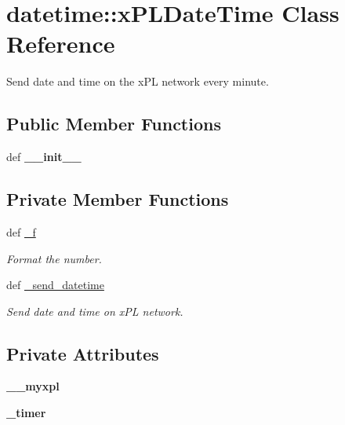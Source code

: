 \hypertarget{classdatetime_1_1xPLDateTime}{
\section{datetime::xPLDateTime Class Reference}
\label{classdatetime_1_1xPLDateTime}
}
Send date and time on the xPL network every minute.  


\subsection*{Public Member Functions}
\begin{CompactItemize}
\item 
\hypertarget{classdatetime_1_1xPLDateTime_b39a3cb860ddd3595e348bc7f910f1e4}{
def \textbf{\_\-\_\-init\_\-\_\-}}
\label{classdatetime_1_1xPLDateTime_b39a3cb860ddd3595e348bc7f910f1e4}

\end{CompactItemize}
\subsection*{Private Member Functions}
\begin{CompactItemize}
\item 
\hypertarget{classdatetime_1_1xPLDateTime_56f581af02f2f66b6b8d21fe910b9b5d}{
def \hyperlink{classdatetime_1_1xPLDateTime_56f581af02f2f66b6b8d21fe910b9b5d}{\_\-f}}
\label{classdatetime_1_1xPLDateTime_56f581af02f2f66b6b8d21fe910b9b5d}

\begin{CompactList}\small\item\em Format the number. \item\end{CompactList}\item 
\hypertarget{classdatetime_1_1xPLDateTime_8705cd0ed46a76dda2d82c1a87fc1b3e}{
def \hyperlink{classdatetime_1_1xPLDateTime_8705cd0ed46a76dda2d82c1a87fc1b3e}{\_\-send\_\-datetime}}
\label{classdatetime_1_1xPLDateTime_8705cd0ed46a76dda2d82c1a87fc1b3e}

\begin{CompactList}\small\item\em Send date and time on xPL network. \item\end{CompactList}\end{CompactItemize}
\subsection*{Private Attributes}
\begin{CompactItemize}
\item 
\hypertarget{classdatetime_1_1xPLDateTime_1b15c71df12789d777f44dc8d39e48f9}{
\textbf{\_\-\_\-myxpl}}
\label{classdatetime_1_1xPLDateTime_1b15c71df12789d777f44dc8d39e48f9}

\item 
\hypertarget{classdatetime_1_1xPLDateTime_7d66e43fe5cd70d3e9c8a90ae406dcc7}{
\textbf{\_\-timer}}
\label{classdatetime_1_1xPLDateTime_7d66e43fe5cd70d3e9c8a90ae406dcc7}

\end{CompactItemize}


